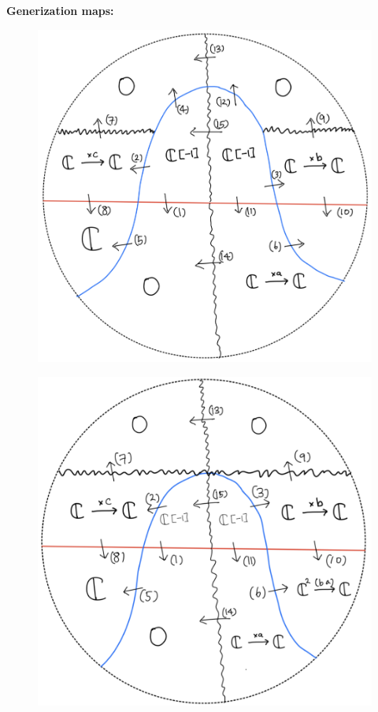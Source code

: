 \textbf{Generization maps:}
\begin{figure}[H]
    \centering
    \includegraphics[scale = 0.45]{diagrams/cobord'2/40.png} 
    \caption{}
    \label{fig:your-label}
\end{figure}
\begin{figure}[H]
    \centering
    \includegraphics[scale = 0.45]{diagrams/cobord'2/41.png} 
    \caption{}
    \label{fig:your-label}
\end{figure}

